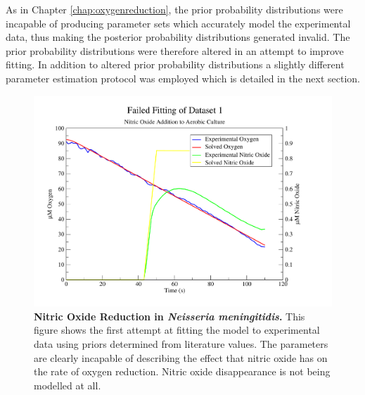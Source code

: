 As in Chapter \ref{chap:oxygenreduction}, the prior probability distributions were incapable of producing parameter sets which accurately model the experimental data, thus making the posterior probability distributions generated invalid. The prior probability distributions were therefore altered in an attempt to improve fitting. In addition to altered prior probability distributions a slightly different parameter estimation protocol was employed which is detailed in the next section.

\begin{figure}[tbp]
 \centering
 \includegraphics[width=15cm, trim=1cm 1cm 3cm 1cm, clip=true]{./06-noreduction/data/aer-no-sim1.pdf}
 \caption[{Nitric Oxide Reduction in \textit{Neisseria meningitidis}.}]{{\bf Nitric Oxide Reduction in \textit{Neisseria meningitidis}.} This figure shows the first attempt at fitting the model to experimental data using priors determined from literature values. The parameters are clearly incapable of describing the effect that nitric oxide has on the rate of oxygen reduction. Nitric oxide disappearance is not being modelled at all.}
 \label{fig:nosim1.1}
\end{figure}

